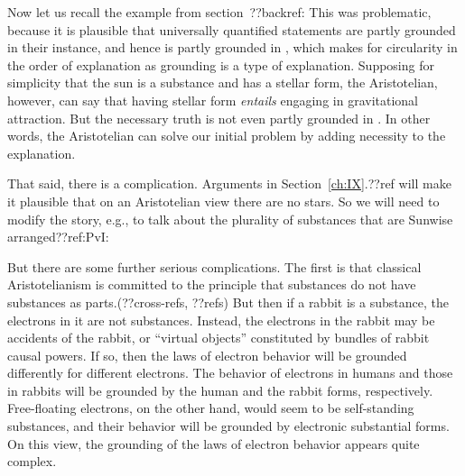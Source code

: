 Now let us recall the example from section~??backref:
This was problematic, because it is plausible that universally quantified statements are partly grounded in their
instance, and hence  is partly grounded in , which makes for circularity in the order
of explanation as grounding is a type of explanation. Supposing for simplicity that the sun is a substance and
has a stellar form, the Aristotelian, however, can say that having stellar form \textit{entails} engaging in
gravitational attraction.
But the necessary truth  is not even partly grounded in . In other words, the Aristotelian
can solve our initial problem by adding necessity to the explanation.

That said, there is a complication. Arguments in Section~\ref{ch:IX}.??ref will make it plausible that on an
Aristotelian view there are no stars. So we will need to modify the story, e.g., to talk about the plurality of
substances that are Sunwise arranged??ref:PvI:

But there are some further serious complications. The first is that classical Aristotelianism is committed to the principle that 
substances do not have substances as parts.(??cross-refs, ??refs) But then if a rabbit is a substance, the electrons in
it are not substances. Instead, the electrons in the rabbit may be accidents of the rabbit, or ``virtual objects'' 
constituted by bundles of rabbit causal powers. If so, then the laws of electron behavior will be grounded differently
for different electrons. The behavior of electrons in humans and those in rabbits will be grounded by the human and the 
rabbit forms, respectively. Free-floating electrons, on the other hand, would seem to be self-standing substances, and
their behavior will be grounded by electronic substantial forms. On this view, the grounding of the laws of electron 
behavior appears quite complex.

